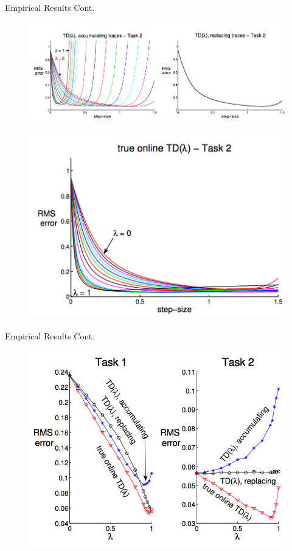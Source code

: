 \documentclass[xcolor={table}]{beamer}
\begin{document}
\begin{frame}{Empirical Results Cont.}
    \begin{figure}
        \centering
        \includegraphics[scale = 0.33]{fig2-3.png}
        \label{fig:my_label}
    \end{figure}
    \begin{figure}
        \centering
        \includegraphics[scale = 0.33]{fig2-4.png}
        \label{fig:my_label}
    \end{figure}
\end{frame}

\begin{frame}{Empirical Results Cont.}
    \begin{figure}
        \centering
        \includegraphics[scale = 0.45]{fig3.png}
        \label{fig:my_label}
    \end{figure}
\end{frame}
\end{document}
